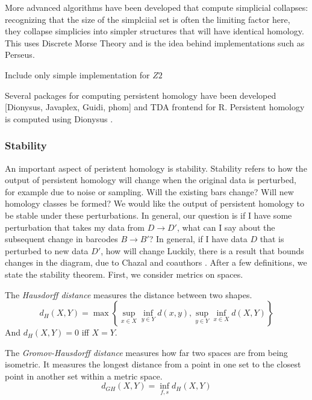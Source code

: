 More advanced algorithms have been developed that compute simplicial collapses: recognizing that the size of the simplciial set is often the limiting factor here, they collapse simplicies into simpler structures that will have identical homology.
This uses Discrete Morse Theory and is the idea behind implementations such as Perseus.

Include only simple implementation for $Z2$

Several packages for computing persistent homology have been developed [Dionysus, Javaplex, Guidi, phom] and TDA frontend for R.
Persistent homology is computed using Dionysus \cite{Morozov:2012}.

\subsubsection{Stability}
\label{subsubsec:ph_stability}

An important aspect of peristent homology is stability.
Stability refers to how the output of persistent homology will change when the original data is perturbed, for example due to noise or sampling.
Will the existing bars change?
Will new homology classes be formed?
We would like the output of persistent homology to be stable under these perturbations.
In general, our question is if I have some perturbation that takes my data from $D\rightarrow D'$, what can I say about the subsequent change in barcodes $B\rightarrow B'$?
In general, if I have data $D$ that is perturbed to new data $D'$, how will change
Luckily, there is a result that bounds changes in the diagram, due to Chazal and coauthors \citep{Chazal:2009wc}.
After a few definitions, we state the stability theorem.
First, we consider metrics on spaces.

\begin{defn}
\label{defn:hausdorff}
The \emph{Hausdorff distance} measures the distance between two shapes.
\begin{equation}
d_{H}(X,Y) = \max\left\{ \sup_{x \in X} \inf_{y \in Y} d(x,y), \sup_{y \in Y} \inf_{x \in X} d(X,Y) \right\}
\end{equation}
And $d_H(X,Y)=0$ iff $X=Y$.
\end{defn}

\begin{defn}
\label{defn:gromovhausdorff}
The \emph{Gromov-Hausdorff distance} measures how far two spaces are from being isometric.
It measures the longest distance from a point in one set to the closest point in another set within a metric space.
\begin{equation}
d_{GH}(X,Y)=\inf_{f,s} d_H(X,Y)
\end{equation}
\end{defn}

